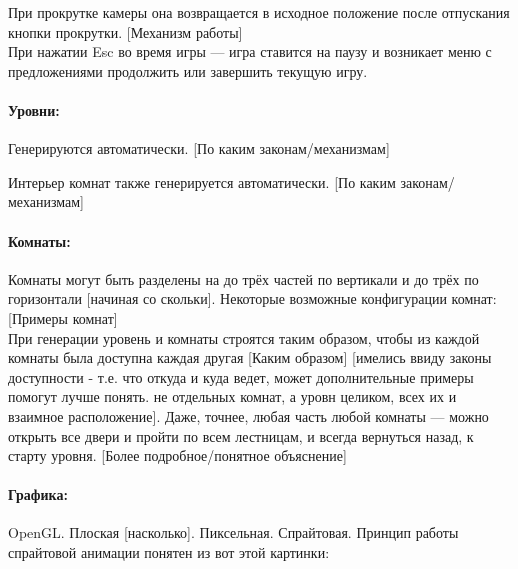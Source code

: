 \documentclass[12pt,a4paper]{article}
\begin{document}
При прокрутке камеры она возвращается в исходное положение после отпускания кнопки прокрутки. {\color{red} [Механизм работы]}\\

При нажатии Esc во время игры --- игра ставится на паузу и возникает меню с предложениями продолжить или завершить текущую игру.

\paragraph{Уровни:}
Генерируются автоматически. {\color{red} [По каким законам/механизмам]}

Интерьер комнат также генерируется автоматически. {\color{red} [По каким законам/механизмам]}\ans{[Аналогично]}

\paragraph{Комнаты:}
Комнаты могут быть разделены на до трёх частей по вертикали и до трёх по горизонтали{\color{red} [начиная со скольки]}\ans{[С одной]}. Некоторые возможные конфигурации комнат:\\

{\color{blue}[Примеры комнат]}\\

При генерации уровень и комнаты строятся таким образом, чтобы из каждой комнаты была доступна каждая другая {\color{red} [Каким образом]} {\color{red} [имелись ввиду законы доступности - т.е. что откуда и куда ведет, может дополнительные примеры помогут лучше понять. не отдельных комнат, а уровн целиком, всех их и взаимное расположение]}. Даже, точнее, любая часть любой комнаты --- можно открыть все двери и пройти по всем лестницам, и всегда вернуться назад, к старту уровня. {\color{red} [Более подробное/понятное объяснение]}

\paragraph{Графика:}
OpenGL. Плоская {\color{red} [насколько]}\ans{[2D]}. Пиксельная. Спрайтовая. Принцип работы спрайтовой анимации понятен из вот этой картинки:\\
\end{document}

